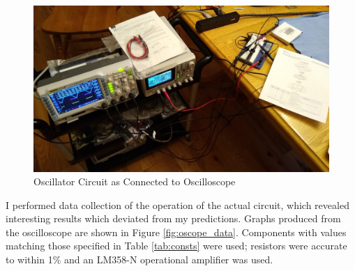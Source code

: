 \documentclass[12pt]{article}
\begin{document}
\begin{figure}[h!]
\centering
\includegraphics[width=1.0\textwidth]{Oscope_setup.jpg}
\caption{Oscillator Circuit as Connected to Oscilloscope}
\label{fig:oscope_setup}
\end{figure}

\noindent
I performed data collection of the operation of the actual circuit, which revealed interesting results which deviated from my predictions. Graphs produced from the oscilloscope are shown in Figure \ref{fig:oscope_data}. Components with values matching those specified in Table \ref{tab:consts} were used; resistors were accurate to within 1\% and an LM358-N operational amplifier was used.
\end{document}
